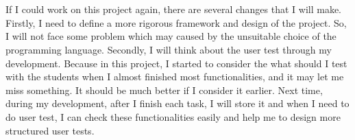 \\
\\
If I could work on this project again, there are several changes that I will make. Firstly, I need to define a more rigorous framework and design of the project. So, I will not face some problem which may caused by the unsuitable choice of the programming language. Secondly, I will think about the user test through my development. Because in this project, I started to consider the what should I test with the students when I almost finished most functionalities, and it may let me miss something. It should be much better if I consider it earlier. Next time, during my development, after I finish each task, I will store it and when I need to do user test, I can check these functionalities easily and help me to design more structured user tests.
